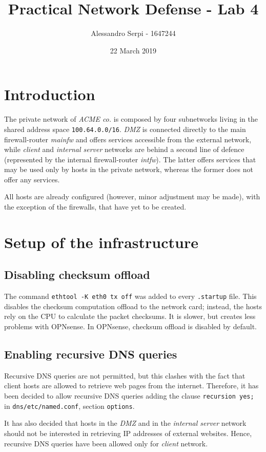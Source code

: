 \documentclass[draft]{homework}
\title{Practical Network Defense - Lab 4}
\author{Alessandro Serpi - 1647244}
\date{22 March 2019}
\newcommand{\opn}{OPNsense\xspace}
\begin{document}
    \maketitle
    \tableofcontents
    
    
    \section{Introduction}
    The private network of \textit{ACME co.} is composed by four subnetworks living in the shared address space \texttt{100.64.0.0/16}. \textit{DMZ} is connected directly to the main firewall-router \textit{mainfw }and offers services accessible from the external network, while \textit{client} and \textit{internal server} networks are behind a second line of defence (represented by the internal firewall-router \textit{intfw}). The latter offers services that may be used only by hosts in the private network, whereas the former does not offer any services.
    
    All hosts are already configured (however, minor adjustment may be made), with the exception of the firewalls, that have yet to be created. 
    
    
    \section{Setup of the infrastructure}
    \subsection{Disabling checksum offload}
    The command \texttt{ethtool -K eth0 tx off} was added to every \texttt{.startup} file. This disables the checksum computation offload to the network card; instead, the hosts rely on the CPU to calculate the packet checksums. It is slower, but creates less problems with \opn.
    In \opn, checksum offload is disabled by default.
    
    \subsection{Enabling recursive DNS queries}
    Recursive DNS queries are not permitted, but this clashes with the fact that client hosts are allowed to retrieve web pages from the internet. Therefore, it has been decided to allow recursive DNS queries adding the clause \texttt{recursion yes;} in \texttt{dns/etc/named.conf}, section \texttt{options}.
    
    It has also decided that hosts in the \textit{DMZ} and in the \textit{internal server} network should not be interested in retrieving IP addresses of external websites. Hence, recursive DNS queries have been allowed only for \textit{client} network.
    
\end{document}
